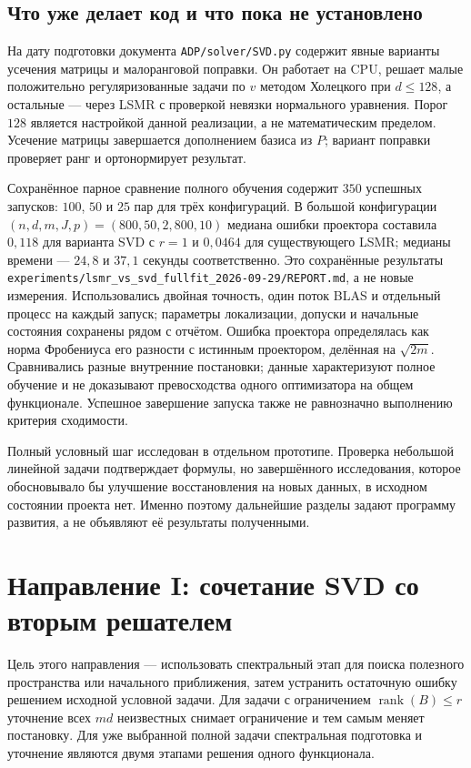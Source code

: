 \documentclass[11pt,a4paper]{article}
\numberwithin{equation}{section}
\theoremstyle{remark}
\DeclareMathOperator{\rank}{rank}
\newcommand{\src}[1]{\nolinkurl{#1}}
\begin{document}
\subsection{Что уже делает код и что пока не установлено}
На дату подготовки документа \src{ADP/solver/SVD.py} содержит явные
варианты усечения матрицы и малоранговой поправки. Он работает на CPU,
решает малые положительно регуляризованные задачи по $v$ методом Холецкого
при $d\le128$, а остальные --- через LSMR с проверкой невязки нормального
уравнения. Порог $128$ является настройкой данной реализации, а не
математическим пределом. Усечение матрицы завершается дополнением базиса
из $P$; вариант поправки проверяет ранг и ортонормирует результат.

Сохранённое парное сравнение полного обучения содержит $350$ успешных
запусков: $100$, $50$ и $25$ пар для трёх конфигураций. В большой конфигурации
$(n,d,m,J,p)=(800,50,2,800,10)$ медиана ошибки проектора составила $0{,}118$
для варианта SVD с $r=1$ и $0{,}0464$ для существующего LSMR;
медианы времени --- $24{,}8$ и $37{,}1$ секунды соответственно.
Это сохранённые результаты
\src{experiments/lsmr_vs_svd_fullfit_2026-09-29/REPORT.md},
а не новые измерения. Использовались двойная точность, один поток BLAS
и отдельный процесс на каждый запуск; параметры локализации, допуски
и начальные состояния сохранены рядом с отчётом. Ошибка проектора
определялась как норма Фробениуса его разности с истинным проектором,
делённая на $\sqrt{2m}$. Сравнивались разные внутренние постановки; данные
характеризуют полное обучение и не доказывают превосходства одного
оптимизатора на общем функционале. Успешное завершение запуска также
не равнозначно выполнению критерия сходимости.

Полный условный шаг исследован в отдельном прототипе. Проверка небольшой
линейной задачи подтверждает формулы, но завершённого исследования,
которое обосновывало бы улучшение восстановления на новых данных,
в исходном состоянии проекта нет. Именно поэтому дальнейшие разделы
задают программу развития, а не объявляют её результаты полученными.

\section{Направление I: сочетание SVD со вторым решателем}\label{sec:second}

Цель этого направления --- использовать спектральный этап для поиска
полезного пространства или начального приближения, затем устранить
остаточную ошибку решением исходной условной задачи.
Для задачи с ограничением $\rank(B)\le r$ уточнение всех $md$ неизвестных
снимает ограничение и тем самым меняет постановку.
Для уже выбранной полной задачи спектральная подготовка и уточнение
являются двумя этапами решения одного функционала.
\end{document}
